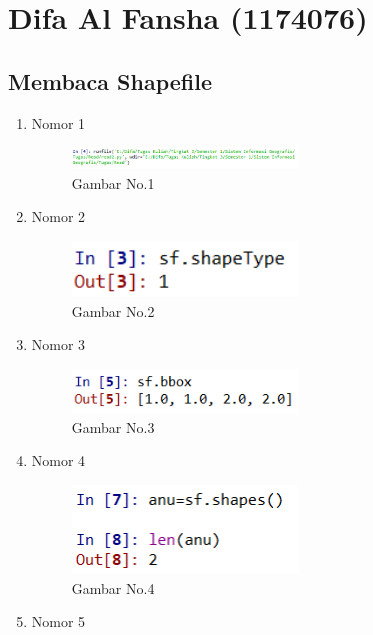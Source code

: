 \section{Difa Al Fansha (1174076)}
\subsection{Membaca Shapefile}
\begin{enumerate}
	\item Nomor 1
	
	\begin{figure}[H]
		\includegraphics[width=6cm]{figures/Tugas3/1174076/read1.png}
		\centering
		\caption{Gambar No.1}
	\end{figure}
	\item Nomor 2
	
	\begin{figure}[H]
		\includegraphics[width=6cm]{figures/Tugas3/1174076/read2.png}
		\centering
		\caption{Gambar No.2}
	\end{figure}
	\item Nomor 3
	
	\begin{figure}[H]
		\includegraphics[width=6cm]{figures/Tugas3/1174076/read3.png}
		\centering
		\caption{Gambar No.3}
	\end{figure}
	\item Nomor 4
	
	\begin{figure}[H]
		\includegraphics[width=6cm]{figures/Tugas3/1174076/read4.png}
		\centering
		\caption{Gambar No.4}
	\end{figure}
	\item Nomor 5
	

\end{enumerate}
